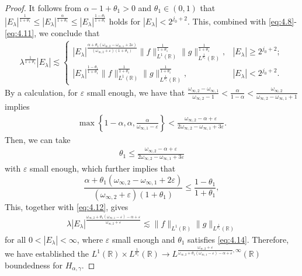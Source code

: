 \documentclass[11pt, twoside, leqno]{article}
\theoremstyle{definition}
\numberwithin{equation}{section}
\begin{document}
\begin{proof}
It follows from $\alpha-1+\theta_{1}>0$ and $\theta_1\in (0,1)$ that
$ |E_\lambda|^{{\frac{1}{1+\theta_{1}}}}\leq |E_\lambda|^{\frac{\alpha}{1+\theta_{1}}}\leq |E_\lambda|^{\frac{1-\theta_{1}}{1+\theta_{1}}}$
holds for $|E_{\lambda}|<2^{j_0+2}$. This, combined with \eqref{eq:4.8}-\eqref{eq:4.11}, we conclude that
\begin{align}\label{eq:4.12}
\lambda^{\frac{1}{1+\theta_{1}}}|E_{\lambda}|\lesssim
\begin{cases}
   |E_\lambda|^{\frac{\alpha+\theta_1(\omega_{\infty,2}-\omega_{\infty,1}+2\varepsilon)}{(\omega_{\infty,2}+\varepsilon)(1+\theta_{1})}}
 \|f\|_{L^{1}(\mathbb{R})}^{\frac{1}{1+\theta_{1}}}\|g\|_{L^{\frac{1}{\theta_1}}(\mathbb{R})}^{\frac{1}{1+\theta_{1}}}, & |E_\lambda|\geq2^{j_0+2}; \\
 |E_\lambda|^{\frac{1-\theta_{1}}{1+\theta_{1}}}
\|f\|_{L^{1}(\mathbb{R})}^{\frac{1}{1+\theta_{1}}}\|g\|_{L^{\frac{1}{\theta_1}}(\mathbb{R})}^{\frac{1}{1+\theta_{1}}}, &|E_{\lambda}|<2^{j_0+2}.
\end{cases}
\end{align}
By a calculation, for $\varepsilon$ small enough, we have that $\frac{\omega_{\infty,2}-\omega_{\infty,1}}{\omega_{\infty,2}-1}<\frac{\alpha}{1-\alpha}<\frac{\omega_{\infty,2}}{\omega_{\infty,2}-\omega_{\infty,1}+1}$ implies
\begin{align}\label{eq:4.13}
\max\left\{1-\alpha, \alpha, \frac{\alpha}{\omega_{\infty,1}-\varepsilon}\right\}<\frac{\omega_{\infty,2}-\alpha+\varepsilon}{2\omega_{\infty,2}-\omega_{\infty,1}+3\varepsilon}.
\end{align}
Then, we can take
\begin{align}\label{eq:4.14}
\theta_1\leq \frac{\omega_{\infty,2}-\alpha+\varepsilon}{2\omega_{\infty,2}-\omega_{\infty,1}+3\varepsilon}
\end{align}
with $\varepsilon$ small enough, which further implies that
$$\frac{\alpha+\theta_1(\omega_{\infty,2}-\omega_{\infty,1}+2\varepsilon)}{(\omega_{\infty,2}+\varepsilon)(1+\theta_{1})}\leq \frac{1-\theta_{1}}{1+\theta_{1}},$$
This, together with \eqref{eq:4.12}, gives
\begin{align}\label{eq:4.15}
\lambda|E_{\lambda}|^{\frac{\omega_{\infty,2}+ \theta_1(\omega_{\infty,1}-\varepsilon)-\alpha+\varepsilon}{\omega_{\infty,2}+\varepsilon}}\lesssim \|f\|_{L^{1}(\mathbb{R})}\|g\|_{L^{\frac{1}{\theta_1}}(\mathbb{R})}
\end{align}
for all $0<|E_\lambda|<\infty$, where $\varepsilon$ small enough and $\theta_1$ satisfies \eqref{eq:4.14}. Therefore, we have established the $L^{1}(\mathbb{R})\times L^{\frac{1}{\theta_{1}}}(\mathbb{R})\rightarrow L^{\frac{\omega_{\infty,2}+\varepsilon}{\omega_{\infty,2}+ \theta_1(\omega_{\infty,1}-\varepsilon)-\alpha+\varepsilon}, \infty}(\mathbb{R})$ boundedness for $H_{\alpha,\gamma}$.


\end{proof}
\end{document}
